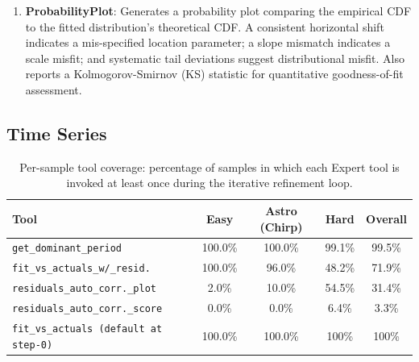 \documentclass{article}
\begin{document}
\begin{enumerate}
    \item \textbf{ProbabilityPlot}: Generates a probability plot comparing the empirical 
    CDF to the fitted distribution's theoretical CDF. A consistent horizontal shift indicates 
    a mis-specified location parameter; a slope mismatch indicates a scale misfit; and 
    systematic tail deviations suggest distributional misfit. Also reports a 
    Kolmogorov-Smirnov (KS) statistic for quantitative goodness-of-fit assessment.
\end{enumerate}

\subsection{Time Series}

\begin{table}[t]
\centering
\caption{Per-sample tool coverage: percentage of samples in which each Expert tool is invoked at least once during the iterative refinement loop.}
\label{tab:per-sample-coverage}
\begin{tabular}{l c c c c}
\toprule
\textbf{Tool} & \textbf{Easy} & \textbf{Astro (Chirp)} & \textbf{Hard} & \textbf{Overall} \\
\midrule
\texttt{get\_dominant\_period}          & 100.0\% & 100.0\% & 99.1\% & 99.5\% \\
\texttt{fit\_vs\_actuals\_w/\_resid.}   & 100.0\% & 96.0\%  & 48.2\% & 71.9\% \\
\texttt{residuals\_auto\_corr.\_plot}   & 2.0\%   & 10.0\%  & 54.5\% & 31.4\% \\
\texttt{residuals\_auto\_corr.\_score}  & 0.0\%   & 0.0\%   & 6.4\%  & 3.3\%  \\
\texttt{fit\_vs\_actuals (default at step-0)}               & 100.0\%   & 100.0\%   & 100\%  & 100\%  \\
\bottomrule
\end{tabular}
\end{table}
\end{document}
